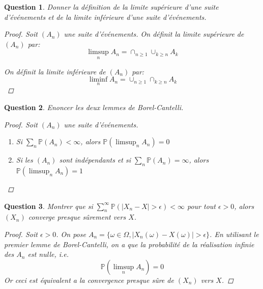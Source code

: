 \documentclass{article}
\theoremstyle{plain}
\newtheorem{question}{Question}
\theoremstyle{definition}
\begin{document}
\begin{question}
	Donner la définition de la limite supérieure d'une suite d'événements et de la limite inférieure d'une suite d'événements.
	\begin{proof}
		Soit $(A_n)$ une suite d'événements. On définit la limite supérieure de $(A_n)$ par:
		\begin{equation*}
			\limsup_n A_n = \cap_{n \geq 1} \cup_{k \geq n} A_k
		\end{equation*}

		On définit la limite inférieure de $(A_n)$ par:
		\begin{equation*}
			\liminf_n A_n = \cup_{n \geq 1} \cap_{k \geq n} A_k
		\end{equation*}
	\end{proof}
\end{question}

\begin{question}
	Enoncer les deux lemmes de Borel-Cantelli.
	\begin{proof}
		Soit $(A_n)$ une suite d'événements.
		\begin{enumerate}
			\item Si $\sum_n \mathbb{P} (A_n) < \infty$, alors $\mathbb{P} (\limsup_n A_n) = 0$
			\item Si les $(A_n)$ sont indépendants et si $\sum_n \mathbb{P} (A_n) = \infty$, alors $\mathbb{P} (\limsup_n A_n) = 1$
		\end{enumerate}
	\end{proof}
\end{question}


\begin{question}
	Montrer que si $\sum_n^{\infty} \mathbb{P} (|X_n - X| > \epsilon) < \infty$ pour tout $\epsilon > 0$, alors $(X_n)$ converge presque sûrement vers $X$.

	\begin{proof}
		Soit $\epsilon > 0$. On pose $A_n = \{\omega \in \Omega, |X_n(\omega) - X(\omega)| > \epsilon\}$. En utilisant le premier
		lemme de Borel-Cantelli, on a que la probabilité de la réalisation infinie des $A_n$ est nulle, i.e.
		\begin{equation*}
			\mathbb{P} (\limsup_n A_n) = 0
		\end{equation*}
		Or ceci est équivalent a la convergence presque sûre de $(X_n)$ vers $X$.
	\end{proof}
\end{question}
\end{document}

